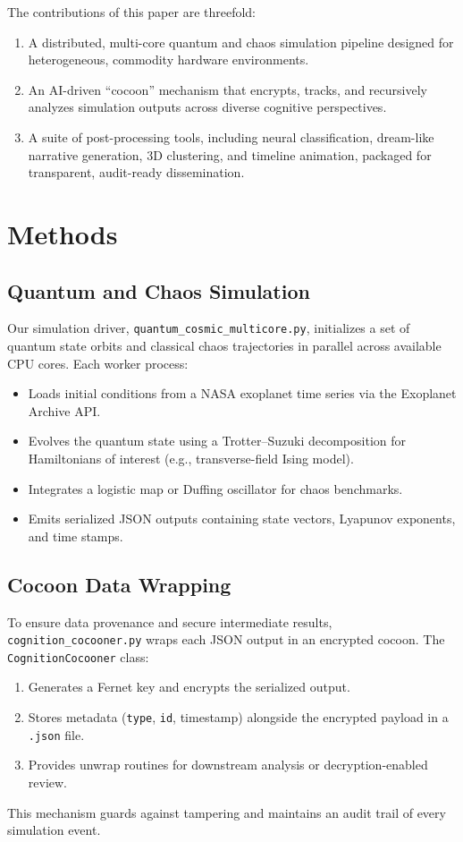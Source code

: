 \documentclass[11pt,a4paper]{article}
\begin{document}
The contributions of this paper are threefold:
\begin{enumerate}
\item A distributed, multi-core quantum and chaos simulation pipeline designed for heterogeneous, commodity hardware environments.
\item An AI-driven ``cocoon'' mechanism that encrypts, tracks, and recursively analyzes simulation outputs across diverse cognitive perspectives.
\item A suite of post-processing tools, including neural classification, dream-like narrative generation, 3D clustering, and timeline animation, packaged for transparent, audit-ready dissemination.
\end{enumerate}

\section{Methods}
\subsection{Quantum and Chaos Simulation}
Our simulation driver, \texttt{quantum\_cosmic\_multicore.py}, initializes a set of quantum state orbits and classical chaos trajectories in parallel across available CPU cores. Each worker process:
\begin{itemize}
\item Loads initial conditions from a NASA exoplanet time series via the Exoplanet Archive API.
\item Evolves the quantum state using a Trotter–Suzuki decomposition for Hamiltonians of interest (e.g., transverse-field Ising model).
\item Integrates a logistic map or Duffing oscillator for chaos benchmarks.
\item Emits serialized JSON outputs containing state vectors, Lyapunov exponents, and time stamps.
\end{itemize}

\subsection{Cocoon Data Wrapping}
To ensure data provenance and secure intermediate results, \texttt{cognition\_cocooner.py} wraps each JSON output in an encrypted cocoon. The \texttt{CognitionCocooner} class:
\begin{enumerate}
\item Generates a Fernet key and encrypts the serialized output.
\item Stores metadata (\texttt{type}, \texttt{id}, timestamp) alongside the encrypted payload in a \texttt{.json} file.
\item Provides unwrap routines for downstream analysis or decryption-enabled review.
\end{enumerate}
This mechanism guards against tampering and maintains an audit trail of every simulation event.
\end{document}
